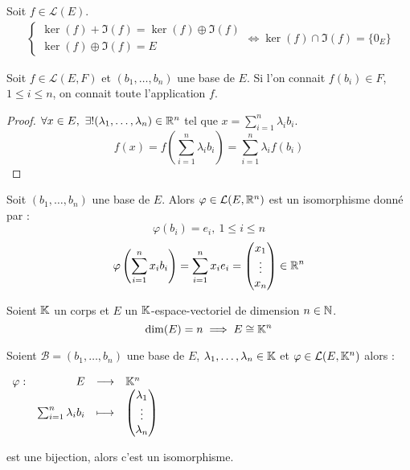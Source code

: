 \begin{corollary}
    Soit $f \in \mathcal{L}(E)$.
    \begin{align*}
        \begin{cases}
            \ker(f) + \Im(f) = \ker(f) \oplus \Im(f) \\
            \ker(f) \oplus \Im(f) = E
        \end{cases}
        \iff 
        \ker(f) \cap \Im(f) = \{0_E\}
    \end{align*}
\end{corollary}

\begin{proposition}
    Soit $f \in \mathcal{L}(E, F)$ et $(b_1, \ldots, b_n)$ une base de $E$. Si l'on connait $f(b_i) \in F$, $1 \leq i \leq n$, on connait toute l'application $f$.
\end{proposition}

\begin{proof}
	$\forall x \in E,\ \exists ! (\lambda_1, \ldots, \lambda_n) \in \mathbb{R}^n$ tel que $x = \sum_{i=1}^{n} \lambda_i b_i$.
	\[ f(x) = f \left( \sum_{i=1}^{n} \lambda_i b_i \right) = \sum_{i=1}^{n} \lambda_i f(b_i) \]
\end{proof}

\begin{corollary}
    Soit $(b_1, \ldots, b_n)$ une base de $E$. Alors $\varphi \in \mathcal{L}(E, \mathbb{R}^n)$ est un isomorphisme donné par :
    \[ \varphi(b_i) = e_i,\ 1 \leq i \leq n \]
    \[ \varphi \left( \sum_{i = 1}^{n} x_i b_i \right) = \sum_{i = 1}^{n} x_i e_i = 
    \begin{pmatrix}
        x_1 \\
        \vdots \\
        x_n
    \end{pmatrix}
    \in \mathbb{R}^n
     \]
\end{corollary}

\begin{lemma} Soient $\mathbb{K}$ un corps et $E$ un $\mathbb{K}$-espace-vectoriel de dimension $n \in \mathbb{N}$.
    \[ \dim(E) = n \implies E \cong \mathbb{K}^n \]
\end{lemma}

\begin{lemma}
    Soient $\mathcal{B} = (b_1, \ldots, b_n)$ une base de $E$, $\lambda_1, \ldots, \lambda_n \in \mathbb{K}$ et $\varphi \in \mathcal{L}(E, \mathbb{K}^n)$  alors :
    \begin{center}
    	$
    	\begin{array}{rrcl} \varphi : & E & \longrightarrow & \mathbb{K}^n \\ & \sum_{i = 1}^{n} \lambda_i b_i & \longmapsto & 
    	\begin{pmatrix}
    		\lambda_1 \\
    		\vdots \\
    		\lambda_n
    	\end{pmatrix}
    	 \end{array}
    	$
    \end{center}
    est une bijection, alors c'est un isomorphisme.
\end{lemma}

